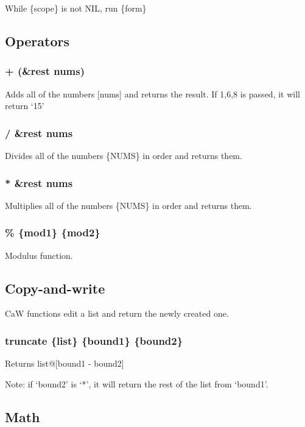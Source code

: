 \documentclass{article}
\begin{document}
	While \{scope\} is not NIL, run \{form\}
	\subsection{Operators}
	
	\subsubsection{+ (\&rest nums)}
	
	Adds all of the numbers [nums] and returns the result. If {1,6,8} is passed, it will return `15'
	
	\subsubsection{/ \&rest nums}
	
	Divides all of the numbers \{NUMS\} in order and returns them.
	
	\subsubsection{* \&rest nums}
	
	Multiplies all of the numbers \{NUMS\} in order and returns them.
	
	\subsubsection{\% \{mod1\} \{mod2\}}
	
	Modulus function.
	
	\subsection{Copy-and-write}
	
	CaW functions edit a list and return the newly created one.
	
	\subsubsection{truncate \{list\} \{bound1\} \{bound2\}}
	
	Returns list@[bound1 - bound2]
	
	Note: if `bound2' is `*', it will return the rest of the list from `bound1'.
	
	\subsection{Math}
	
\end{document}
